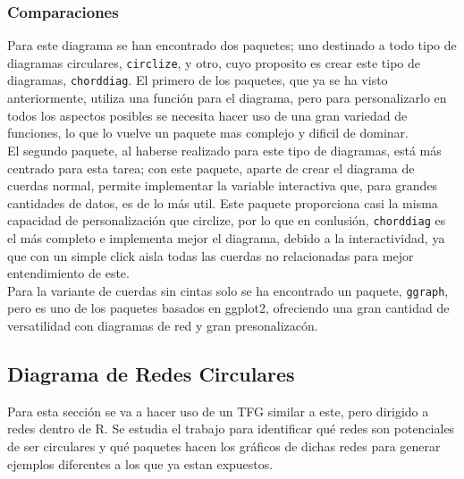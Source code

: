 \documentclass{article}\usepackage[]{graphicx}\usepackage[]{color}
\begin{document}
\subsubsection{Comparaciones}
Para este diagrama se han encontrado dos paquetes; uno destinado a todo tipo de diagramas circulares, \texttt{circlize}, y otro, cuyo proposito es crear este tipo de diagramas, \texttt{chorddiag}. El primero de los paquetes, que ya se ha visto anteriormente, utiliza una funci\'on para el diagrama, pero para personalizarlo en todos los aspectos posibles se necesita hacer uso de una gran variedad de funciones, lo que lo vuelve un paquete mas complejo y dificil de dominar.~\\
El segundo paquete, al haberse realizado para este tipo de diagramas, est\'a m\'as centrado para esta tarea; con este paquete, aparte de crear el diagrama de cuerdas normal, permite implementar la variable interactiva que, para grandes cantidades de datos, es de lo m\'as util. Este paquete proporciona casi la misma capacidad de personalizaci\'on que circlize, por lo que en conlusi\'on, \texttt{chorddiag} es el m\'as completo e implementa mejor el diagrama, debido a la interactividad, ya que con un simple click aisla todas las cuerdas no relacionadas para mejor entendimiento de este.~\\
Para la variante de cuerdas sin cintas solo se ha encontrado un paquete, \texttt{ggraph}, pero es uno de los paquetes basados en ggplot2, ofreciendo una gran cantidad de versatilidad con diagramas de red y gran presonalizac\'on.
\clearpage
\subsection{Diagrama de Redes Circulares}\label{ssec:redes}
Para esta secci\'on se va a hacer uso de un TFG\cite{tfg} similar a este, pero dirigido a redes dentro de R. Se estudia el trabajo para identificar qu\'e redes son potenciales de ser circulares y qu\'e paquetes hacen los gr\'aficos de dichas redes para generar ejemplos diferentes a los que ya estan expuestos.
\end{document}
